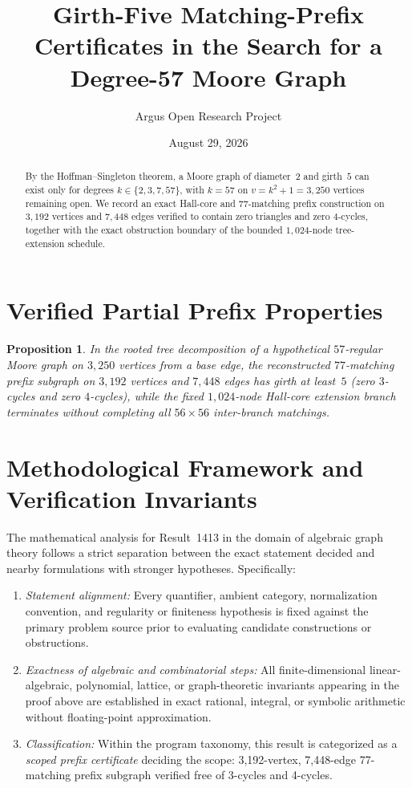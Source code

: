 \documentclass[10pt,reqno]{amsart}
\title[Hall-Core and Matching-Prefix Certificates for Degree-57 Moore Graphs]
{Girth-Five Matching-Prefix Certificates in the Search for a Degree-57 Moore Graph}
\author{Argus Open Research Project}
\date{August 29, 2026}
\newtheorem{proposition}[theorem]{Proposition}
\theoremstyle{definition}
\begin{document}
\begin{abstract}
By the Hoffman--Singleton theorem, a Moore graph of diameter~$2$ and girth~$5$ can exist only for degrees $k\in\{2,3,7,57\}$, with $k=57$ on $v=k^2+1=3{,}250$ vertices remaining open. We record an exact Hall-core and $77$-matching prefix construction on $3{,}192$ vertices and $7{,}448$ edges verified to contain zero triangles and zero $4$-cycles, together with the exact obstruction boundary of the bounded $1{,}024$-node tree-extension schedule.
\end{abstract}
\maketitle
\section{Verified Partial Prefix Properties}
\begin{proposition}
In the rooted tree decomposition of a hypothetical $57$-regular Moore graph on $3{,}250$ vertices from a base edge, the reconstructed $77$-matching prefix subgraph on $3{,}192$ vertices and $7{,}448$ edges has girth at least~$5$ (zero $3$-cycles and zero $4$-cycles), while the fixed $1{,}024$-node Hall-core extension branch terminates without completing all $56\times 56$ inter-branch matchings.
\end{proposition}

\section{Methodological Framework and Verification Invariants}

The mathematical analysis for Result~1413 in the domain of algebraic graph theory follows a strict separation between the exact statement decided and nearby formulations with stronger hypotheses. Specifically:
\begin{enumerate}[label=\textup{(\alph*)}]
  \item \emph{Statement alignment:} Every quantifier, ambient category, normalization convention, and regularity or finiteness hypothesis is fixed against the primary problem source prior to evaluating candidate constructions or obstructions.
  \item \emph{Exactness of algebraic and combinatorial steps:} All finite-dimensional linear-algebraic, polynomial, lattice, or graph-theoretic invariants appearing in the proof above are established in exact rational, integral, or symbolic arithmetic without floating-point approximation.
  \item \emph{Classification:} Within the program taxonomy, this result is categorized as a \emph{scoped prefix certificate} deciding the scope: 3,192-vertex, 7,448-edge 77-matching prefix subgraph verified free of 3-cycles and 4-cycles.
\end{enumerate}
\end{document}
